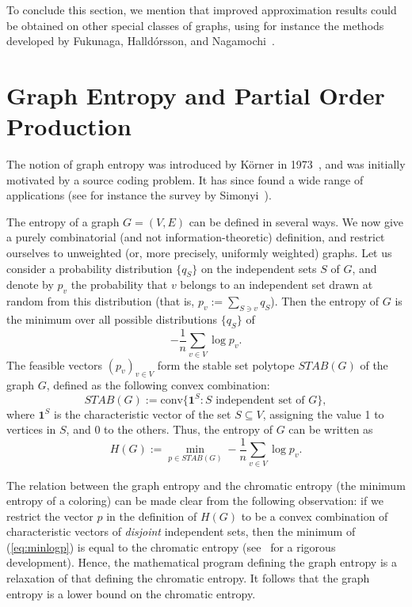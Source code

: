 \documentclass[10pt,a4paper]{article}
\begin{document}
To conclude this section, we mention that
improved approximation results could be obtained on other special classes of graphs, 
using for instance the methods developed by Fukunaga, Halld\'orsson, and Nagamochi~\cite{FHN-soda,FHN07}.

\section{Graph Entropy and Partial Order Production}
\label{sec:ent}

The notion of graph entropy was introduced by K\"orner in 1973~\cite{K73}, and was initially motivated by a source coding problem.
It has since found a wide range of applications (see for instance the survey by Simonyi~\cite{S95}). 

The entropy of a graph $G=(V,E)$ can be defined in several ways. We now give a purely combinatorial (and not information-theoretic) definition, and restrict ourselves to unweighted (or, more precisely, uniformly weighted) graphs. Let us consider a probability distribution $\{ q_S\}$ on the independent sets $S$ of $G$, and denote by $p_v$ the probability that $v$ belongs to an independent set drawn at random from this distribution (that is, $p_v := \sum_{S \ni v} q_S$). Then the entropy of $G$ is the minimum over all possible distributions $\{ q_S\}$ of
\begin{equation}
\label{eq:minlogp}
- \frac1n \sum_{v\in V} \log p_v.
\end{equation}
The feasible vectors $(p_v)_{v\in V}$ form the stable set polytope $STAB(G)$ of the graph $G$, defined as the following convex combination:
$$
STAB (G) := \mathrm{conv} \{ \mathbf{1}^S : S \text{ independent set of } G \},
$$
where $\mathbf{1}^S$ is the characteristic vector of the set $S\subseteq V$, assigning the value 1 to
vertices in $S$, and 0 to the others. Thus, the entropy of $G$ can be written as
$$
H(G) := \min_{p\in STAB(G)} -\frac1n \sum_{v\in V} \log p_v.
$$

The relation between the graph entropy and the chromatic entropy (the minimum entropy of a coloring) can be made clear
from the following observation: if we restrict the vector $p$ in the definition of $H(G)$ to be a convex combination of characteristic vectors of {\em disjoint\/} independent sets, then the minimum of (\ref{eq:minlogp}) is equal to the chromatic entropy (see~\cite{CFJ07} for a rigorous development). Hence, the mathematical program defining the graph entropy is a relaxation of that defining the chromatic entropy. It follows that the graph entropy is a lower bound on the chromatic entropy.\medskip
\end{document}

